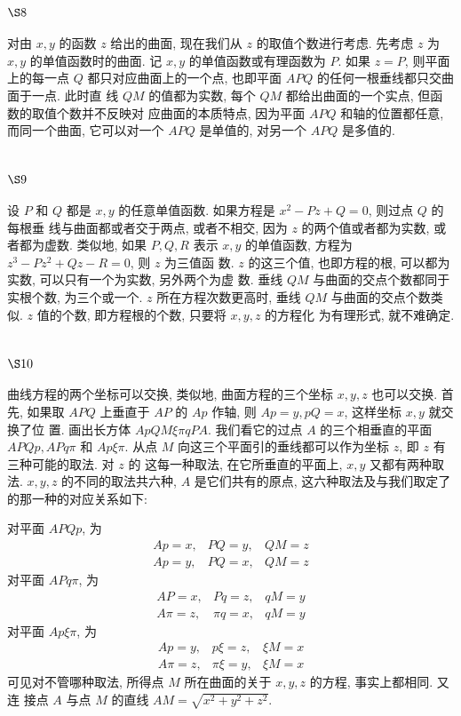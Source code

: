 \section{$\S 8$}

对由 $x, y$ 的函数 $z$ 给出的曲面, 现在我们从 $z$ 的取值个数进行考虑. 先考虑 $z$ 为 $x, y$ 的单值函数时的曲面. 记 $x, y$ 的单值函数或有理函数为 $P$. 如果 $z=P$, 则平面上的每一点 $Q$ 都只对应曲面上的一个点, 也即平面 $A P Q$ 的任何一根垂线都只交曲面于一点. 此时直 线 $Q M$ 的值都为实数, 每个 $Q M$ 都给出曲面的一个实点, 但函数的取值个数并不反映对 应曲面的本质特点, 因为平面 $A P Q$ 和轴的位置都任意, 而同一个曲面, 它可以对一个 $A P Q$ 是单值的, 对另一个 $A P Q$ 是多值的.

\section{$\S 9$}

设 $P$ 和 $Q$ 都是 $x, y$ 的任意单值函数. 如果方程是 $x^{2}-P z+Q=0$, 则过点 $Q$ 的每根垂 线与曲面都或者交于两点, 或者不相交, 因为 $z$ 的两个值或者都为实数, 或者都为虚数. 类似地, 如果 $P, Q, R$ 表示 $x, y$ 的单值函数, 方程为 $z^{3}-P z^{2}+Q z-R=0$, 则 $z$ 为三值函 数. $z$ 的这三个值, 也即方程的根, 可以都为实数, 可以只有一个为实数, 另外两个为虚 数. 垂线 $Q M$ 与曲面的交点个数都同于实根个数, 为三个或一个. $z$ 所在方程次数更高时, 垂线 $Q M$ 与曲面的交点个数类似. $z$ 值的个数, 即方程根的个数, 只要将 $x, y, z$ 的方程化 为有理形式, 就不难确定.

\section{$\S 10$}

曲线方程的两个坐标可以交换, 类似地, 曲面方程的三个坐标 $x, y, z$ 也可以交换. 首 先, 如果取 $A P Q$ 上垂直于 $A P$ 的 $A p$ 作轴, 则 $A p=y, p Q=x$, 这样坐标 $x, y$ 就交换了位 置. 画出长方体 $A p Q M \xi \pi q P A$. 我们看它的过点 $A$ 的三个相垂直的平面 $A P Q p, A P q \pi$ 和 $A p \xi \pi$. 从点 $M$ 向这三个平面引的垂线都可以作为坐标 $z$, 即 $z$ 有三种可能的取法. 对 $z$ 的 这每一种取法, 在它所垂直的平面上, $x, y$ 又都有两种取法. $x, y, z$ 的不同的取法共六种, $A$ 是它们共有的原点, 这六种取法及与我们取定了的那一种的对应关系如下:

对平面 $A P Q p$, 为
\[
\begin{array}{lll}
A p=x, & P Q=y, & Q M=z \\
A p=y, & P Q=x, & Q M=z
\end{array}
\]
对平面 $A P q \pi$, 为
\[
\begin{array}{lll}
A P=x, & P q=z, & q M=y \\
A \pi=z, & \pi q=x, & q M=y
\end{array}
\]
对平面 $A p \xi \pi$, 为
\[
\begin{array}{lll}
A p=y, & p \xi=z, & \xi M=x \\
A \pi=z, & \pi \xi=y, & \xi M=x
\end{array}
\]
可见对不管哪种取法, 所得点 $M$ 所在曲面的关于 $x, y, z$ 的方程, 事实上都相同. 又连 接点 $A$ 与点 $M$ 的直线 $A M=\sqrt{x^{2}+y^{2}+z^{2}}$.

